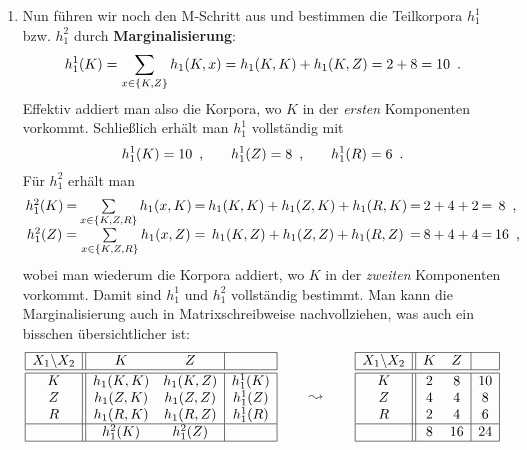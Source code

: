 \documentclass[ngerman, a4paper, 12pt]{article}
\newcommand{\begriff}[1]{\textbf{#1}}
\newcommand{\satzende}{\enskip \text{.}}
\newcommand{\komma}{\enskip \text{,}}
\begin{document}
\begin{enumerate}[label=\textbf{(\alph*)}, leftmargin=0pt]
	\item
	Nun führen wir noch den M-Schritt aus und bestimmen die Teilkorpora $h_1^1$ bzw. $h_1^2$ durch \begriff{Marginalisierung}:
	\begin{equation*}
		h_1^1(K) 
		= \sum_{x \in \menge{K,Z}} h_1(K,x) 
		= h_1(K,K) + h_1(K,Z)
		= 2 + 8
		= 10
		\satzende
	\end{equation*}
	Effektiv addiert man also die Korpora, wo $K$ in der \textit{ersten} Komponenten vorkommt. Schließlich erhält man $h_1^1$ vollständig mit
	\begin{equation*}
		h_1^1(K) = 10 \komma \qquad h_1^1(Z) = 8 \komma \qquad h_1^1(R) = 6 \satzende
	\end{equation*}
	Für $h_1^2$ erhält man
	\begin{equation*}
	\setlength{\arraycolsep}{1pt}
	\begin{array}{ccccccccc}
		h_1^2(K) 
		&=& \sum\limits_{x \in \menge{K,Z,R}} h_1(x,K) 
		&=& h_1(K,K) + h_1(Z,K) + h_1(R,K)
		&=& 2 + 4 + 2
		&=& 8 \komma \\
		h_1^2(Z)
		&=& \sum\limits_{x \in \menge{K,Z,R}} h_1(x,Z)
		&=& h_1(K,Z) + h_1(Z,Z) + h_1(R,Z)
		&=& 8 + 4 + 4
		&=& 16 \komma
	\end{array}
	\end{equation*}
	wobei man wiederum die Korpora addiert, wo $K$ in der \textit{zweiten} Komponenten vorkommt.
	Damit sind $h_1^1$ und $h_1^2$ vollständig bestimmt. 
	Man kann die Marginalisierung auch in Matrixschreibweise nachvollziehen, was auch ein bisschen übersichtlicher ist:
	\begin{equation*}
		\begin{array}{|c||cc|c|}
		\hline
		X_1 \backslash X_2 & K & Z & \\ \hline \hline
		K & h_1(K,K) & h_1(K,Z) & h_1^1(K) \\
		Z & h_1(Z,K) & h_1(Z,Z) & h_1^1(Z) \\
		R & h_1(R,K) & h_1(R,Z) & h_1^1(R) \\ \hline
		  & h_1^2(K) & h_1^2(Z) & \\ \hline
		\end{array}
		\qquad \leadsto \qquad 
		\begin{array}{|c||cc|c|}
		\hline
		X_1 \backslash X_2 & K & Z & \\ \hline \hline
		K & 2 &  8 & 10 \\
		Z & 4 &  4 &  8 \\
		R & 2 &  4 &  6 \\ \hline
	      & 8 & 16 & 24 \\ \hline
		\end{array}
	\end{equation*}


\end{enumerate}
\end{document}
